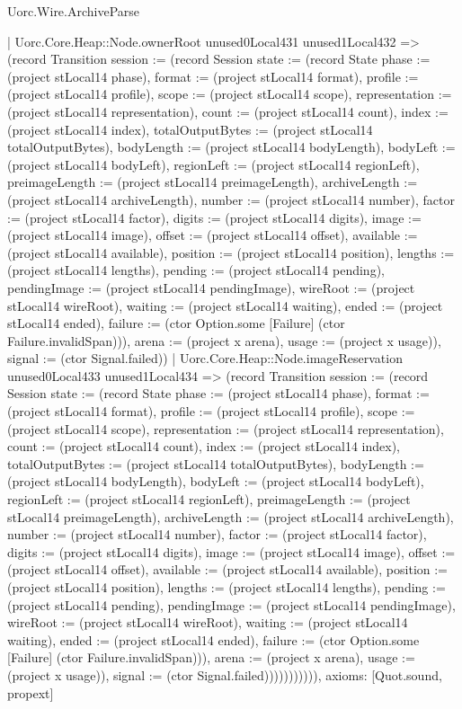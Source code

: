 \begin{lexlean}{Uorc.Wire.ArchiveParse}
\begin{semanticmodule}
{            | Uorc.Core.Heap::Node.ownerRoot unused0Local431 unused1Local432 => (record Transition {session := (record Session {state := (record State {phase := (project stLocal14 phase), format := (project stLocal14 format), profile := (project stLocal14 profile), scope := (project stLocal14 scope), representation := (project stLocal14 representation), count := (project stLocal14 count), index := (project stLocal14 index), totalOutputBytes := (project stLocal14 totalOutputBytes), bodyLength := (project stLocal14 bodyLength), bodyLeft := (project stLocal14 bodyLeft), regionLeft := (project stLocal14 regionLeft), preimageLength := (project stLocal14 preimageLength), archiveLength := (project stLocal14 archiveLength), number := (project stLocal14 number), factor := (project stLocal14 factor), digits := (project stLocal14 digits), image := (project stLocal14 image), offset := (project stLocal14 offset), available := (project stLocal14 available), position := (project stLocal14 position), lengths := (project stLocal14 lengths), pending := (project stLocal14 pending), pendingImage := (project stLocal14 pendingImage), wireRoot := (project stLocal14 wireRoot), waiting := (project stLocal14 waiting), ended := (project stLocal14 ended), failure := (ctor Option.some [Failure] (ctor Failure.invalidSpan))}), arena := (project x arena), usage := (project x usage)}), signal := (ctor Signal.failed)})
            | Uorc.Core.Heap::Node.imageReservation unused0Local433 unused1Local434 => (record Transition {session := (record Session {state := (record State {phase := (project stLocal14 phase), format := (project stLocal14 format), profile := (project stLocal14 profile), scope := (project stLocal14 scope), representation := (project stLocal14 representation), count := (project stLocal14 count), index := (project stLocal14 index), totalOutputBytes := (project stLocal14 totalOutputBytes), bodyLength := (project stLocal14 bodyLength), bodyLeft := (project stLocal14 bodyLeft), regionLeft := (project stLocal14 regionLeft), preimageLength := (project stLocal14 preimageLength), archiveLength := (project stLocal14 archiveLength), number := (project stLocal14 number), factor := (project stLocal14 factor), digits := (project stLocal14 digits), image := (project stLocal14 image), offset := (project stLocal14 offset), available := (project stLocal14 available), position := (project stLocal14 position), lengths := (project stLocal14 lengths), pending := (project stLocal14 pending), pendingImage := (project stLocal14 pendingImage), wireRoot := (project stLocal14 wireRoot), waiting := (project stLocal14 waiting), ended := (project stLocal14 ended), failure := (ctor Option.some [Failure] (ctor Failure.invalidSpan))}), arena := (project x arena), usage := (project x usage)}), signal := (ctor Signal.failed)})))))))))),
  axioms: [Quot.sound, propext]
}


\end{semanticmodule}
\end{lexlean}
